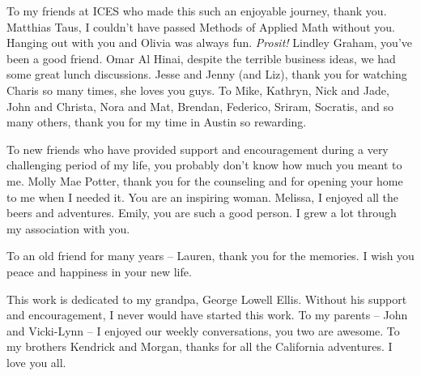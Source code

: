 \documentclass[12pt]{report} %
\begin{document}
\begin{acknowledgments}
To my friends at ICES who made this such an enjoyable journey, thank you. 
Matthias Taus, I couldn't have passed Methods of Applied Math without you.
Hanging out with you and Olivia was always fun. \emph{Prosit!}
Lindley Graham, you've been a good friend. Omar Al Hinai, despite the terrible business ideas, we had some great lunch discussions.
Jesse and Jenny (and Liz), thank you for watching Charis so many times, she loves you guys.
To Mike, Kathryn, Nick and Jade, John and Christa, Nora and Mat, Brendan, Federico, Sriram, Socratis, and so many others, thank you
for my time in Austin so rewarding.

To new friends who have provided support and encouragement during a very challenging period of my life, you probably don't know how much you meant to me.
Molly Mae Potter, thank you for the counseling and for opening your home to me when I needed it. You are an inspiring woman. 
Melissa, I enjoyed all the beers and adventures.
Emily, you are such a good person. I grew a lot through my association with you.

To an old friend for many years -- Lauren, thank you for the memories. I wish you peace and happiness in your new life.

This work is dedicated to my grandpa, George Lowell Ellis. Without his support and encouragement, I never would have started this work. 
To my parents -- John and Vicki-Lynn -- I enjoyed our weekly conversations, you two are awesome.
To my brothers Kendrick and Morgan, thanks for all the California adventures.
I love you all.




\end{acknowledgments}
\end{document}
